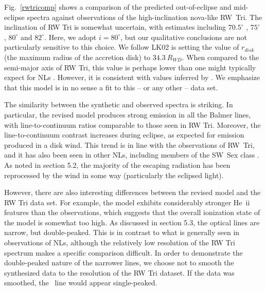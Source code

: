 \documentclass[preprint, a4paper, 11pt]{aastex}
\begin{document}
Fig.~\ref{rwtricomp} shows a comparison of the predicted
out-of-eclipse and mid-eclipse spectra against observations of the
high-inclination nova-like RW~Tri. The inclination of RW Tri is
somewhat uncertain, with estimates including $70.5^\circ$
\citep{smak1995}, $75^\circ$ \citep{groot2004}, $80^\circ$
\citep{longmore1981} and $82^\circ$\citep{frankking1981}. Here, we
adopt $i = 80^\circ$, but our qualitative conclusions are not
particularly sensitive to this choice. 
We follow LK02 is setting the value of $r_{disk}$ (the maximum radius of the accretion disk)
to $34.3~R_{WD}$. When compared to the semi-major axis of RW Tri,
this value is perhaps lower than one might 
typically expect for NLs \citep{harropallinwarner1996}. 
However, it is consistent
with values inferred by \cite{rutten1992}.
We emphasize that this model is in no sense a fit to this -- or any other -- data set.


The similarity between the synthetic and observed spectra is
striking. In particular, the revised model produces strong emission in
all the Balmer lines, with line-to-continuum ratios comparable to
those seen in RW Tri. Moreover, the line-to-continuum contrast
increases during eclipse, as expected for emission produced in a disk
wind. This trend is in line with the observations of RW~Tri, and it
has also been seen in other NLs, including members of the SW~Sex class
\citep{neustroev2011}. As noted in section 5.2, the majority
of the escaping radiation has been reprocessed by the wind in some way
(particularly the eclipsed light).

However, there are also interesting differences between the revised
model and the RW Tri data set. For example, the model exhibits
considerably stronger He~{\sc ii} features than the observations,
which suggests that the overall ionization state of the model is
somewhat too high. As discussed in section 5.3, the optical lines are
narrow, but double-peaked. This is in contrast to what is generally seen in observations
of NLs, although the relatively low resolution of the RW Tri
spectrum makes a specific comparison difficult. In order to demonstrate
the double-peaked nature of the narrower lines, we choose not to 
smooth the synthesized data to the resolution of the RW Tri dataset.
If the data was smoothed, the \ha\ line would appear single-peaked.

\end{document}
